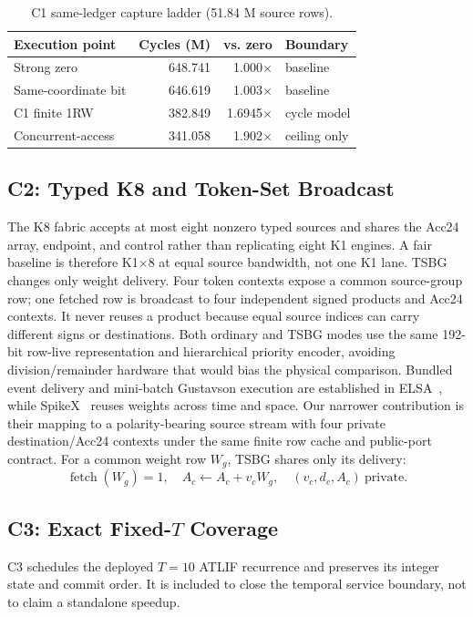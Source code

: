 \documentclass[conference]{IEEEtran}
\begin{document}
\begin{table}[t]
\caption{C1 same-ledger capture ladder (51.84 M source rows).}
\label{tab:c1ladder}
\centering
\scriptsize
\begin{tabular}{@{}lrrl@{}}
\toprule
Execution point & Cycles (M) & vs. zero & Boundary \\
\midrule
Strong zero & 648.741 & 1.000$\times$ & baseline \\
Same-coordinate bit & 646.619 & 1.003$\times$ & baseline \\
C1 finite 1RW & 382.849 & 1.6945$\times$ & cycle model \\
Concurrent-access & 341.058 & 1.902$\times$ & ceiling only \\
\bottomrule
\end{tabular}
\end{table}

\subsection{C2: Typed K8 and Token-Set Broadcast}
The K8 fabric accepts at most eight nonzero typed sources and shares the Acc24
array, endpoint, and control rather than replicating eight K1 engines.  A fair
baseline is therefore K1$\times$8 at equal source bandwidth, not one K1 lane.
TSBG changes only weight delivery.  Four token contexts expose a common
source-group row; one fetched row is broadcast to four independent signed
products and Acc24 contexts.  It never reuses a product because equal source
indices can carry different signs or destinations.  Both ordinary and TSBG
modes use the same 192-bit row-live representation and hierarchical priority
encoder, avoiding division/remainder hardware that would bias the physical
comparison.  Bundled event delivery and mini-batch Gustavson execution are
established in ELSA~\cite{elsa}, while SpikeX~\cite{spikex} reuses weights
across time and space.  Our narrower contribution is their mapping to a
polarity-bearing source stream with four private destination/Acc24 contexts
under the same finite row cache and public-port contract.
For a common weight row $W_g$, TSBG shares only its delivery:
\begin{equation}
\operatorname{fetch}(W_g)=1,\quad
A_c\leftarrow A_c+v_cW_g,\quad (v_c,d_c,A_c)\ \text{private}.
\label{eq:tsbg}
\end{equation}

\subsection{C3: Exact Fixed-$T$ Coverage}
C3 schedules the deployed $T{=}10$ ATLIF recurrence and preserves its integer
state and commit order.  It is included to close the temporal service boundary,
not to claim a standalone speedup.
\end{document}
